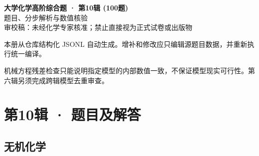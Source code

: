 \documentclass[UTF8,11pt,a4paper]{ctexart}
\begin{document}
\begin{center}
{\LARGE\bfseries 大学化学高阶综合题 · 第10辑 (100题)}\\[0.8em]
{\large 题目、分步解析与数值核验}\\[0.5em]
{\small \textcolor{red!65!black}{审校稿：未经化学专家核准；禁止直接视为正式试卷或出版物}}
\end{center}
\vspace{1em}
\noindent 本册从仓库结构化 JSONL 自动生成。增补和修改应只编辑源题目数据，并重新执行统一编译。
\par 机械方程残差检查只能说明指定模型的内部数值一致，不保证模型现实可行性。第六辑另须完成跨辑模型去重审查。
\tableofcontents
\clearpage
\section*{第10辑 · 题目及解答}
\subsection*{无机化学}
\end{document}
